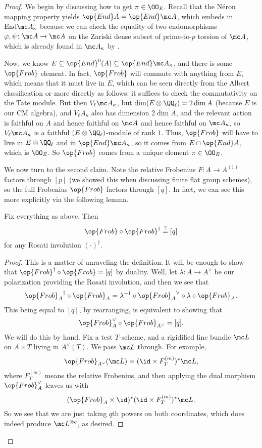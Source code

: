 \documentclass[../notes.tex]{subfiles}
\begin{document}
\begin{proof}
	We begin by discussing how to get $\pi\in\OO_E$. Recall that the N\'eron mapping property yields $\op{End}A=\op{End}\mc A$, which embeds in $\mathrm{End}\mc A_\kappa$ because we can check the equality of two endomorphisms $\varphi,\psi\colon\mc A\to\mc A$ on the Zariski dense subset of prime-to-$p$ torsion of $\mc A$, which is already found in $\mc A_\kappa$ by .

	Now, we know $E\subseteq\op{End}^0(A)\subseteq\op{End}\mc A_\kappa$, and there is some $\op{Frob}$ element. In fact, $\op{Frob}$ will commute with anything from $E$, which means that it must live in $E$, which can be seen directly from the Albert classification or more directly as follows: it suffices to check the commutativity on the Tate module. But then $V_\ell\mc A_\kappa$, but $\dim(E\otimes\QQ_\ell)=2\dim A$ (because $E$ is our CM algebra), and $V_\ell A_\kappa$ also has dimension $2\dim A$, and the relevant action is faithful on $A$ and hence faithful on $\mc A$ and hence faithful on $\mc A_\kappa$, so $V_\ell\mc A_\kappa$ is a faithful $(E\otimes\QQ_\ell)$-module of rank $1$. Thus, $\op{Frob}$ will have to live in $E\otimes\QQ_\ell$ and in $\op{End}\mc A_\kappa$, so it comes from $E\cap\op{End}A$, which is $\OO_E$. So $\op{Frob}$ comes from a unique element $\pi\in\OO_E$.

	We now turn to the second claim. Note the relative Frobenius $F\colon A\to A^{(1)}$ factors through $[p]$ (we showed this when discussing finite flat group schemes), so the full Frobenius $\op{Frob}$ factors through $[q]$. In fact, we can see this more explicitly via the following lemma.
	\begin{lemma} \label{lem:frob-through-q}
		Fix everything as above. Then
		\[{\op{Frob}}\circ{\op{Frob}}^\dagger\stackrel?=[q]\]
		for any Rosati involution $(\cdot)^\dagger$.
	\end{lemma}
	\begin{proof}
		This is a matter of unraveling the definition. It will be enough to show that ${\op{Frob}}^\dagger\circ{\op{Frob}}=[q]$ by duality. Well, let $\lambda\colon A\to A^\lor$ be our polarization providing the Rosati involution, and then we see that
		\[{\op{Frob}_A}^\dagger\circ{\op{Frob}_A}=\lambda^{-1}\circ{\op{Frob}_A}^\lor\circ\lambda\circ\op{Frob}_A.\]
		This being equal to $[q]$, by rearranging, is equivalent to showing that
		\[{\op{Frob}_A^\lor}\circ{\op{Frob}_{A^\lor}}=[q].\]
		We will do this by hand. Fix a test $T$-scheme, and a rigidified line bundle $\mc L$ on $A\times T$ living in $A^\lor(T)$. We pass $\mc L$ through. For example,
		\[\op{Frob}_{A^\lor}(\mc L)=({\id}\times F_T^{(m)})^*\mc L,\]
		where $F_T^{(m)}$ means the relative Frobenius, and then applying the dual morphism $\op{Frob}_A^\lor$ leaves us with
		\[({\op{Frob}_A}\times{\id})^*({\id}\times F_T^{(m)})^*\mc L.\]
		So we see that we are just taking $q$th powers on both coordinates, which does indeed produce $\mc L^{\otimes q}$, as desired.
	\end{proof}


\end{proof}
\end{document}
